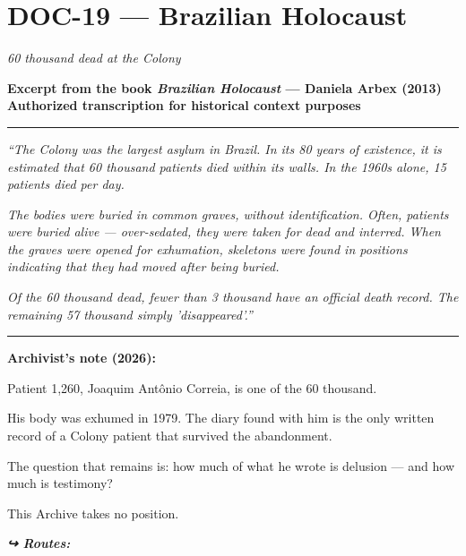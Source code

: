 \section*{\textbf{DOC-19} --- Brazilian Holocaust}

\noindent \textit{60 thousand dead at the Colony}

\noindent \textbf{Excerpt from the book \textit{Brazilian Holocaust} --- Daniela Arbex (2013)}
\textbf{Authorized transcription for historical context purposes}

\vspace{0.5em}\noindent\rule{\textwidth}{0.5pt}\vspace{0.5em}

\noindent \textit{\textquotedblleft{}The Colony was the largest asylum in Brazil. In its 80 years of existence, it is estimated that 60 thousand patients died within its walls. In the 1960s alone, 15 patients died per day.}

\noindent \textit{The bodies were buried in common graves, without identification. Often, patients were buried alive --- over-sedated, they were taken for dead and interred. When the graves were opened for exhumation, skeletons were found in positions indicating that they had moved after being buried.}

\noindent \textit{Of the 60 thousand dead, fewer than 3 thousand have an official death record. The remaining 57 thousand simply 'disappeared'.\textquotedblright{}}

\vspace{0.5em}\noindent\rule{\textwidth}{0.5pt}\vspace{0.5em}

\noindent \textbf{Archivist's note (2026):}

\noindent Patient 1,260, Joaquim Antônio Correia, is one of the 60 thousand.

\noindent His body was exhumed in 1979. The diary found with him is the only written record of a Colony patient that survived the abandonment.

\noindent The question that remains is: how much of what he wrote is delusion --- and how much is testimony?

\noindent This Archive takes no position.

\vspace{0.5em}
\noindent\textit{\textbf{↪ Routes:}  \rotasep {} \rotasep {}}
